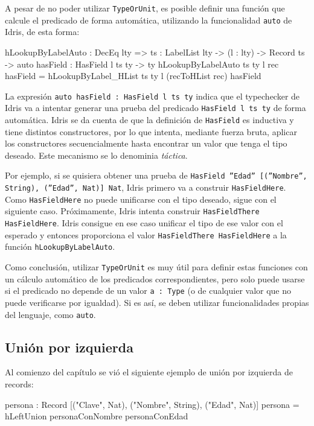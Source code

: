 A pesar de no poder utilizar \texttt{TypeOrUnit}, es posible definir una función que calcule el predicado de forma automática, utilizando la funcionalidad \texttt{auto} de Idris, de esta forma:

\begin{code}
hLookupByLabelAuto : DecEq lty => {ts : LabelList lty} ->
  (l : lty) -> Record ts ->
  {auto hasField : HasField l ts ty} -> ty
hLookupByLabelAuto {ts} {ty} l rec {hasField} =
  hLookupByLabel_HList {ts} {ty} l (recToHList rec) hasField
\end{code}

La expresión \texttt{auto hasField : HasField l ts ty} indica que el typechecker de Idris va a intentar generar una prueba del predicado \texttt{HasField l ts ty} de forma automática. Idris se da cuenta de que la definición de \texttt{HasField} es inductiva y tiene distintos constructores, por lo que intenta, mediante fuerza bruta, aplicar los constructores secuencialmente hasta encontrar un valor que tenga el tipo deseado. Este mecanismo se lo denominia \textit{táctica}.

Por ejemplo, si se quisiera obtener una prueba de \texttt{HasField ''Edad'' [(''Nombre'', String), (''Edad'', Nat)] Nat}, Idris primero va a construir \texttt{HasFieldHere}. Como \texttt{HasFieldHere} no puede unificarse con el tipo deseado, sigue con el siguiente caso. Próximamente, Idris intenta construir \texttt{HasFieldThere HasFieldHere}. Idris consigue en ese caso unificar el tipo de ese valor con el esperado y entonces proporciona el valor \texttt{HasFieldThere HasFieldHere} a la función \texttt{hLookupByLabelAuto}.

Como conclusión, utilizar \texttt{TypeOrUnit} es muy útil para definir estas funciones con un cálculo automático de los predicados correspondientes, pero solo puede usarse si el predicado no depende de un valor \texttt{a : Type} (o de cualquier valor que no puede verificarse por igualdad). Si es así, se deben utilizar funcionalidades propias del lenguaje, como \texttt{auto}.

\subsection{Unión por izquierda}

Al comienzo del capítulo se vió el siguiente ejemplo de unión por izquierda de records:

\begin{code}
persona : Record [("Clave", Nat), ("Nombre", String),
  ("Edad", Nat)]
persona = hLeftUnion personaConNombre personaConEdad
\end{code}

